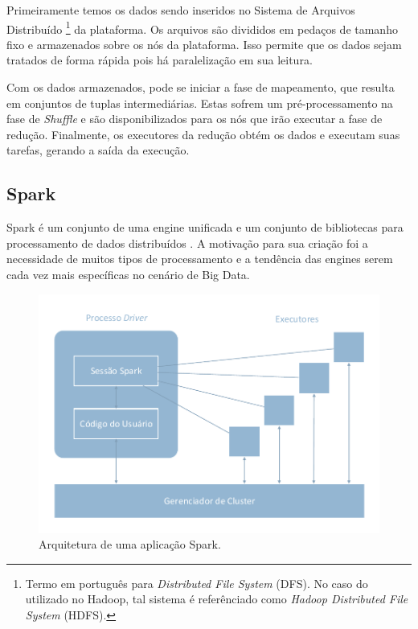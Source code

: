 Primeiramente temos os dados sendo inseridos no Sistema de Arquivos Distribuído 
\footnote{Termo em português para \emph{Distributed File System} (DFS). No caso 
do utilizado no Hadoop, tal sistema é referênciado como \emph{Hadoop Distributed 
File System} (HDFS).} da plataforma. Os arquivos são divididos em pedaços de 
tamanho fixo e armazenados sobre os nós da plataforma. Isso permite que os dados 
sejam tratados de forma rápida pois há paralelização em sua leitura.

Com os dados armazenados, pode se iniciar a fase de mapeamento, que resulta em 
conjuntos de tuplas intermediárias. Estas sofrem um pré-processamento na fase 
de \emph{Shuffle} e são disponibilizados para os nós que irão executar a fase 
de redução. Finalmente, os executores da redução obtém os dados e executam suas 
tarefas, gerando a saída da execução.

\subsection{Spark} \label{ref:spark}

Spark é um conjunto de uma engine unificada e um conjunto de bibliotecas para 
processamento de dados distribuídos \cite{ref:sparkbook}. A motivação para sua 
criação foi a necessidade de muitos tipos de processamento e a tendência das 
engines serem cada vez mais específicas no cenário de Big Data.

\begin{figure}[H]
 \centerline{\includegraphics[width=1\textwidth]{./img/spark-arch.pdf}}
 \caption{Arquitetura de uma aplicação Spark.}
 \label{fig:spark-arch}
\end{figure}

